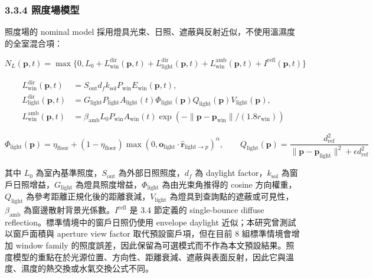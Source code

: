 \documentclass[12pt,a4paper]{article}
\begin{document}
\subsubsection*{3.3.4 照度場模型}

照度場的 nominal model 採用燈具光束、日照、遮蔽與反射近似，不使用溫濕度的全室混合項：


\[
N_L(\mathbf{p},t)=\max\{0,L_0+L_{\mathrm{win}}^{\mathrm{dir}}(\mathbf{p},t)+L_{\mathrm{light}}^{\mathrm{dir}}(\mathbf{p},t)+L_{\mathrm{win}}^{\mathrm{amb}}(\mathbf{p},t)+I^{\mathrm{refl}}(\mathbf{p},t)\}
\]

\[
\begin{aligned}L_{\mathrm{win}}^{\mathrm{dir}}(\mathbf{p},t)&=S_{\mathrm{out}}d_f k_{\mathrm{sol}}P_{\mathrm{win}}E_{\mathrm{win}}(\mathbf{p},t),\\L_{\mathrm{light}}^{\mathrm{dir}}(\mathbf{p},t)&=G_{\mathrm{light}}P_{\mathrm{light}}A_{\mathrm{light}}(t)\Phi_{\mathrm{light}}(\mathbf{p})Q_{\mathrm{light}}(\mathbf{p})V_{\mathrm{light}}(\mathbf{p}),\\L_{\mathrm{win}}^{\mathrm{amb}}(\mathbf{p},t)&=\beta_{\mathrm{amb}}L_0P_{\mathrm{win}}A_{\mathrm{win}}(t)\exp(-\|\mathbf{p}-\mathbf{p}_{\mathrm{win}}\|/(1.8r_{\mathrm{win}}))\end{aligned}
\]

\[
\Phi_{\mathrm{light}}(\mathbf{p})=\eta_{\mathrm{floor}}+(1-\eta_{\mathrm{floor}})\max(0,\mathbf{o}_{\mathrm{light}}\cdot\hat{\mathbf{r}}_{\mathrm{light}\to p})^{\alpha},\qquad Q_{\mathrm{light}}(\mathbf{p})=\frac{d_{\mathrm{ref}}^2}{\|\mathbf{p}-\mathbf{p}_{\mathrm{light}}\|^2+\epsilon d_{\mathrm{ref}}^2}
\]

其中 $L_0$ 為室內基準照度，$S_{\mathrm{out}}$ 為外部日照照度，$d_f$ 為 daylight factor，$k_{\mathrm{sol}}$ 為窗戶日照增益，$G_{\mathrm{light}}$ 為燈具照度增益，$\Phi_{\mathrm{light}}$ 為由光束角推得的 cosine 方向權重，$Q_{\mathrm{light}}$ 為參考距離正規化後的距離衰減，$V_{\mathrm{light}}$ 為燈具到查詢點的遮蔽或可見性，$\beta_{\mathrm{amb}}$ 為窗邊散射背景光係數。$I^{\mathrm{refl}}$ 是 3.4 節定義的 single-bounce diffuse reflection。標準情境中的窗戶日照仍使用 envelope daylight 近似；本研究曾測試以窗戶面積與 aperture view factor 取代預設窗戶項，但在目前 8 組標準情境會增加 window family 的照度誤差，因此保留為可選模式而不作為本文預設結果。照度模型的重點在於光源位置、方向性、距離衰減、遮蔽與表面反射，因此它與溫度、濕度的熱交換或水氣交換公式不同。
\end{document}
